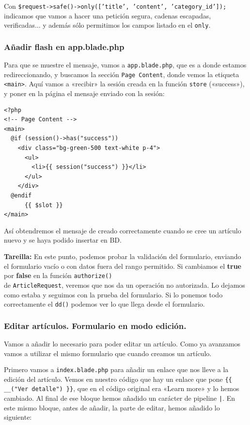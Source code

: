 \documentclass[11pt]{article}
\begin{document}
Con \texttt{\$request->safe()->only(['title', 'content', 'category\_id']);}
indicamos que vamos a hacer una petición segura, cadenas escapadas,
verificadas... y además sólo permitimos los campos listado en el
\texttt{only}.


\subsubsection{Añadir flash en app.blade.php}
\label{sec:org45054eb}
Para que se muestre el mensaje, vamos a \texttt{app.blade.php}, que es a
donde estamos redireccionando, y buscamos la sección \texttt{Page Content},
donde vemos la etiqueta \texttt{<main>}. Aquí vamos a «recibir» la sesión
creada en la función \texttt{store} («success»), y poner en la página el
mensaje enviado con la sesión:
\begin{verbatim}
<?php
<!-- Page Content -->
<main>
  @if (session()->has("success"))
    <div class="bg-green-500 text-white p-4">
      <ul>
        <li>{{ session("success") }}</li>
      </ul>
    </div>
  @endif
      {{ $slot }}
</main>
\end{verbatim}

Así obtendremos el mensaje de creado correctamente cuando se cree un
artículo nuevo y se haya podido insertar en BD.


\textbf{Tareilla:} En este punto, podemos probar la validación del
formulario, enviando el formulario vacío o con datos fuera del rango
permitido.  Si cambiamos el \textbf{true} por \textbf{false} en la función
\texttt{authorize()} \\[0pt]
de \texttt{ArticleRequest}, veremos que nos da un operación no autorizada.
Lo dejamos como estaba y seguimos con la prueba del formulario. Si lo
ponemos todo correctamente el \texttt{dd()} podemos ver lo que llega desde el
formulario.

\subsubsection{Editar artículos. Formulario en modo edición.}
\label{sec:orge0c718c}
Vamos a añadir lo necesario para poder editar un artículo. Como ya
avanzamos vamos a utilizar el mismo formulario que cuando creamos un
artículo.

Primero vamos a \texttt{index.blade.php} para añadir un enlace que nos lleve
a la edición del artículo. Vemos en nuestro código que hay un enlace
que pone \texttt{\{\{ \_\_("Ver detalle") \}\}}, que en el código original era
«Learn more» y lo hemos cambiado. Al final de ese bloque hemos añadido
un carácter de pipeline \texttt{|}. En este mismo bloque, antes de añadir, la
parte de editar, hemos añadido lo siguiente:
\end{document}
